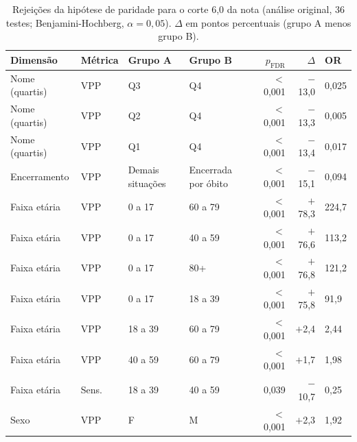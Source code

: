 \begin{table}[htbp]
\centering
\caption{Rejei\c{c}\~oes da hip\'otese de paridade para o corte 6{,}0 da nota (an\'alise original, 36 testes; Benjamini-Hochberg, $\alpha = 0{,}05$). $\Delta$ em pontos percentuais (grupo A menos grupo B).}
\label{tab:qw3-fairness-rejections-corte6}
\small
\begin{tabular}{llllrrl}
\toprule
Dimens\~ao & M\'etrica & Grupo A & Grupo B & $p_{\mathrm{FDR}}$ & $\Delta$ & OR \\
\midrule
Nome (quartis) & VPP & Q3 & Q4 & $<$0{,}001 & $-$13{,}0 & 0{,}025 \\
Nome (quartis) & VPP & Q2 & Q4 & $<$0{,}001 & $-$13{,}3 & 0{,}005 \\
Nome (quartis) & VPP & Q1 & Q4 & $<$0{,}001 & $-$13{,}4 & 0{,}017 \\
Encerramento   & VPP & Demais situa\c{c}\~oes & Encerrada por \'obito & $<$0{,}001 & $-$15{,}1 & 0{,}094 \\
Faixa et\'aria  & VPP & 0 a 17 & 60 a 79 & $<$0{,}001 & $+$78{,}3 & 224{,}7 \\
Faixa et\'aria  & VPP & 0 a 17 & 40 a 59 & $<$0{,}001 & $+$76{,}6 & 113{,}2 \\
Faixa et\'aria  & VPP & 0 a 17 & 80+ & $<$0{,}001 & $+$76{,}8 & 121{,}2 \\
Faixa et\'aria  & VPP & 0 a 17 & 18 a 39 & $<$0{,}001 & $+$75{,}8 & 91{,}9 \\
Faixa et\'aria  & VPP & 18 a 39 & 60 a 79 & $<$0{,}001 & $+$2{,}4 & 2{,}44 \\
Faixa et\'aria  & VPP & 40 a 59 & 60 a 79 & $<$0{,}001 & $+$1{,}7 & 1{,}98 \\
Faixa et\'aria  & Sens. & 18 a 39 & 40 a 59 & 0{,}039     & $-$10{,}7 & 0{,}25 \\
Sexo           & VPP & F & M & $<$0{,}001 & $+$2{,}3 & 1{,}92 \\
\bottomrule
\end{tabular}
\end{table}
